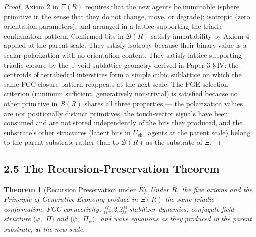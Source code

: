 \documentclass[11pt,oneside]{report}
\newtheorem{theorem}{Theorem}[section]
\theoremstyle{definition}
\theoremstyle{remark}
\begin{document}
\begin{proof}
Axiom 2 in \ensuremath{\Xi (R)} requires that the new agents be immutable
(sphere primitive in the sense that they do not change, move, or
degrade); isotropic (zero orientation parameters); and arranged in a
lattice supporting the triadic confirmation pattern. Confirmed bits in
\ensuremath{\mathcal{B}(R)} satisfy immutability by Axiom 4 applied at the parent scale. They
satisfy isotropy because their binary value is a scalar polarization
with no orientation content. They satisfy
lattice-supporting-triadic-closure by the T-void sublattice geometry
derived in Paper 3 \S\,IV: the centroids of tetrahedral interstices form a
simple cubic sublattice on which the same FCC closure pattern reappears
at the next scale. The PGE selection criterion (minimum sufficient,
generatively non-trivial) is satisfied because no other primitive in
\ensuremath{\mathcal{B}(R)} shares all three properties --- the polarization values are not
positionally distinct primitives, the touch-vector signals have been
consumed and are not stored independently of the bits they produced, and
the substrate's other structures (latent bits in \ensuremath{U_{\mathrm{sh}},} agents at the
parent scale) belong to the parent substrate rather than to \ensuremath{\mathcal{B}(R)} as the
substrate of \ensuremath{\Xi .}

\end{proof}

\subsection*{2.5 The Recursion-Preservation Theorem}

\begin{theorem}[Recursion Preservation under \ensuremath{\hat{R}}]
Under \ensuremath{\hat{R},} the five
axioms and the Principle of Generative Economy produce in \ensuremath{\Xi (R)} the same
triadic confirmation, FCC connectivity, [[4,2,2]] stabilizer
dynamics, conjugate field structure \ensuremath{(\varphi ,} \ensuremath{\Pi )} and \ensuremath{(\psi ,} \ensuremath{\Pi_{\psi}),} and wave
equations as they produced in the parent substrate, at the new scale.
\end{theorem}
\end{document}
